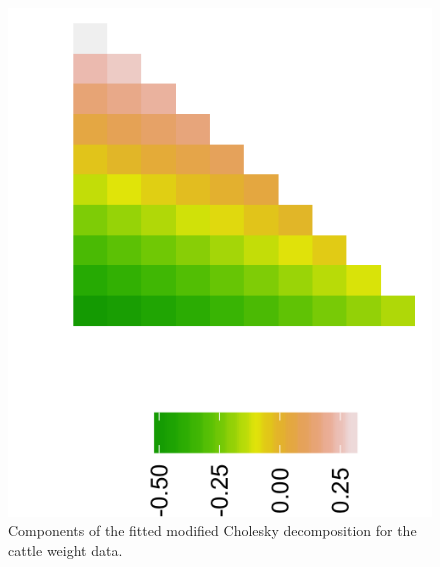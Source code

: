 %

\begin{figure}[H]
  \centering
  \includegraphics[width = \textwidth]{img/chapter-5/cattle-cholesky-estimate-ggplot}
\caption{Components of the fitted modified Cholesky decomposition for the cattle weight data.} \label{fig:fitted-cholesky-decomposition-cattle-date}
\end{figure}


